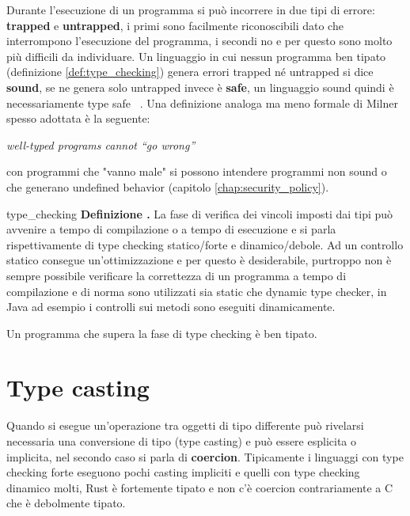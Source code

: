\documentclass[Lau,binding=0.6cm]{sapthesis}
\newenvironment{myDefinition}[2]{ \begin{Definizione}[adjusted title=#1]{}{#2}
    \textbf{Definizione \thetcbcounter.} }{\end{Definizione}}
\begin{document}
Durante l'esecuzione di un programma si può incorrere in due tipi di errore: \textbf{trapped} e \textbf{untrapped}, i primi sono facilmente riconoscibili dato che interrompono l'esecuzione del programma, i secondi no e per questo sono molto più difficili da individuare.
Un linguaggio in cui nessun programma ben tipato (definizione \ref{def:type_checking}) genera errori trapped né untrapped si dice \textbf{sound}, se ne genera solo untrapped invece è \textbf{safe}, un linguaggio sound quindi è necessariamente type safe ~\cite{cencia:dispense}.
Una definizione analoga ma meno formale di Milner spesso adottata è la seguente:

\begin{center}
   \textit{well-typed programs cannot “go wrong”} ~\cite{milner:type_polymorphism}
\end{center}

con programmi che "vanno male" si possono intendere programmi non sound o che generano undefined behavior (capitolo \ref{chap:security_policy}).

\begin{myDefinition}{Type checking}{type_checking}
    La fase di verifica dei vincoli imposti dai tipi può avvenire a tempo di compilazione o a tempo di esecuzione e si parla rispettivamente di type checking statico/forte e dinamico/debole.
    Ad un controllo statico consegue un'ottimizzazione e per questo è desiderabile, purtroppo non è sempre possibile verificare la correttezza di un programma a tempo di compilazione e di norma sono utilizzati sia static che dynamic type checker, in Java ad esempio i controlli sui metodi sono eseguiti dinamicamente.

    Un programma che supera la fase di type checking è ben tipato.     
\end{myDefinition}
 
\section{Type casting}
Quando si esegue un'operazione tra oggetti di tipo differente può rivelarsi necessaria una conversione di tipo (type casting) e può essere esplicita o implicita, nel secondo caso si parla di \textbf{coercion}. Tipicamente i linguaggi con type checking forte eseguono pochi casting impliciti e quelli con type checking dinamico molti, Rust è fortemente tipato e non c'è coercion contrariamente a C che è debolmente tipato.   



\end{document}
